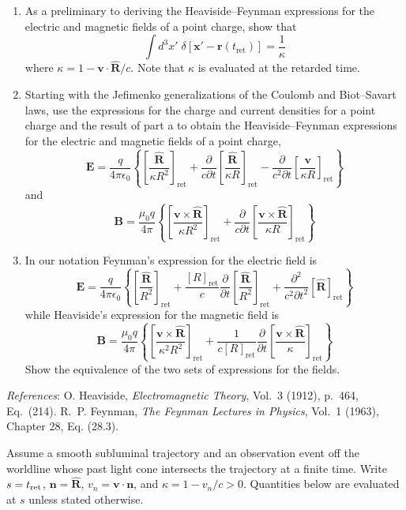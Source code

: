 \begin{enumerate}
\item[(a)] As a preliminary to deriving the Heaviside--Feynman expressions for the electric and magnetic fields of a point charge, show that
\[
\int d^{3}x'\;\delta[\mathbf{x}'-\mathbf{r}(t_{\mathrm{ret}})]=\frac{1}{\kappa}
\]
where $\kappa=1-\mathbf{v}\cdot\hat{\mathbf{R}}/c$. Note that $\kappa$ is evaluated at the retarded time.
\item[(b)] Starting with the Jefimenko generalizations of the Coulomb and Biot--Savart laws, use the expressions for the charge and current densities for a point charge and the result of part a to obtain the Heaviside--Feynman expressions for the electric and magnetic fields of a point charge,
\[
\mathbf{E}=\frac{q}{4\pi\epsilon_{0}}\left\{\left[\frac{\hat{\mathbf{R}}}{\kappa R^{2}}\right]_{\mathrm{ret}}+\frac{\partial}{c\partial t}\left[\frac{\hat{\mathbf{R}}}{\kappa R}\right]_{\mathrm{ret}}-\frac{\partial}{c^{2}\partial t}\left[\frac{\mathbf{v}}{\kappa R}\right]_{\mathrm{ret}}\right\}
\]
and
\[
\mathbf{B}=\frac{\mu_{0}q}{4\pi}\left\{\left[\frac{\mathbf{v}\times\hat{\mathbf{R}}}{\kappa R^{2}}\right]_{\mathrm{ret}}+\frac{\partial}{c\partial t}\left[\frac{\mathbf{v}\times\hat{\mathbf{R}}}{\kappa R}\right]_{\mathrm{ret}}\right\}
\]
\item[(c)] In our notation Feynman's expression for the electric field is
\[
\mathbf{E}=\frac{q}{4\pi\epsilon_{0}}\left\{\left[\frac{\hat{\mathbf{R}}}{R^{2}}\right]_{\mathrm{ret}}+\frac{[R]_{\mathrm{ret}}}{c}\frac{\partial}{\partial t}\left[\frac{\hat{\mathbf{R}}}{R^{2}}\right]_{\mathrm{ret}}+\frac{\partial^{2}}{c^{2}\partial t^{2}}\left[\hat{\mathbf{R}}\right]_{\mathrm{ret}}\right\}
\]
while Heaviside's expression for the magnetic field is
\[
\mathbf{B}=\frac{\mu_{0}q}{4\pi}\left\{\left[\frac{\mathbf{v}\times\hat{\mathbf{R}}}{\kappa^{2}R^{2}}\right]_{\mathrm{ret}}+\frac{1}{c[R]_{\mathrm{ret}}}\frac{\partial}{\partial t}\left[\frac{\mathbf{v}\times\hat{\mathbf{R}}}{\kappa}\right]_{\mathrm{ret}}\right\}
\]
Show the equivalence of the two sets of expressions for the fields.
\end{enumerate}
\emph{References}: O. Heaviside, \emph{Electromagnetic Theory}, Vol.~3 (1912), p.~464, Eq.~(214). R.~P. Feynman, \emph{The Feynman Lectures in Physics}, Vol.~1 (1963), Chapter 28, Eq. (28.3).
\solution

Assume a smooth subluminal trajectory and an observation event off the
worldline whose past light cone intersects the trajectory at a finite time.
Write $s=t_{\rm ret}$, $\mathbf n=\hat{\mathbf R}$, $v_n=\mathbf v\cdot\mathbf n$,
and $\kappa=1-v_n/c>0$. Quantities below are evaluated at $s$ unless stated otherwise.

